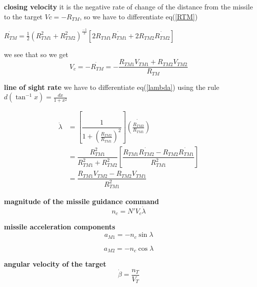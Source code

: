 \textbf{closing velocity} it is the negative rate of change of the distance
from the missile to the target $Vc= -R_{TM} $, so we have to differentiate eq(\ref{RTM})

\begin{center}
	$\dot{R_{TM}}= \frac{1}{2} (R_{TM1}^2 + R_{TM2}^2)^{\frac{-1}{2}} [2 R_{TM1} \dot{R_{TM1}} + 2 R_{TM2} \dot{R_{TM2}}]$
\end{center}

we see that
so we get 
\begin{equation}
V_c = - \dot{R_{TM}} = - \dfrac{R_{TM1} V_{TM1}+R_{TM2} V_{TM2}}{R_{TM}}
\end{equation}

\textbf{line of sight rate} we have to differentiate eq(\ref{lambda}) using the rule $d(\tan^{-1}x) = \frac{dx}{1+x^2}$ 

\begin{equation}
\begin{split}
\dot{\lambda} &= [\dfrac{1}{1+(\frac{R_{TM2}}{R_{TM1}})^2}] \dot{(\frac{R_{TM2}}{R_{TM1}})}\\
&= \dfrac{R_{TM1}^2}{R_{TM1}^2 + R_{TM2}^2}[\dfrac{R_{TM1}\dot{R_{TM2}}- R_{TM2} \dot{R_{TM1}}}{R_{TM1}^2}]\\
&=\dfrac{R_{TM1} V_{TM2} - R_{TM2} V_{TM1}}{R_{TM1}^2}
\end{split}
\end{equation}

\textbf{magnitude of the missile guidance command}
\begin{equation}
n_c= N' V_c \dot{\lambda}
\end{equation}

\textbf{missile acceleration components}
\begin{equation}
a_{M1} = - n_c \sin \lambda
\end{equation}

\begin{equation}
a_{M2} = - n_c \cos \lambda
\end{equation}

\textbf{angular velocity of the target}
\begin{equation}
\dot{\beta} = \dfrac{n_T}{V_T}
\end{equation}

